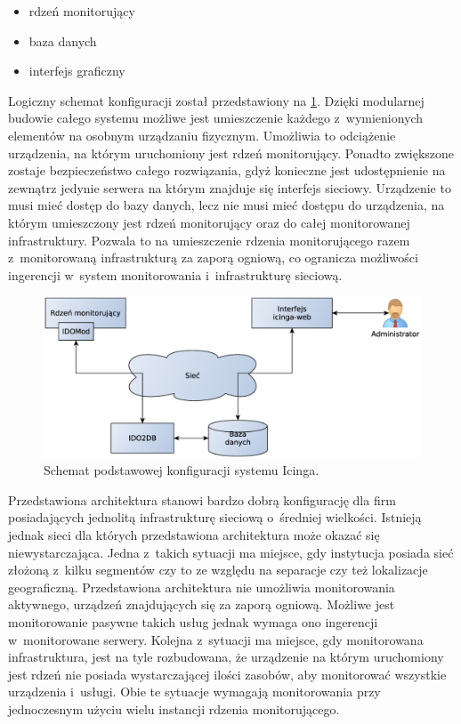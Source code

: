\begin{itemize}
\item rdzeń monitorujący
\item baza danych
\item interfejs graficzny
\end{itemize}

Logiczny schemat konfiguracji został przedstawiony na
\ref{fig:icingaBase}. Dzięki modularnej budowie całego systemu możliwe
jest umieszczenie każdego z~wymienionych elementów na osobnym
urządzaniu fizycznym.  Umożliwia to odciążenie urządzenia, na którym
uruchomiony jest rdzeń monitorujący. Ponadto zwiększone zostaje
bezpieczeństwo całego rozwiązania, gdyż konieczne jest udostępnienie
na zewnątrz jedynie serwera na którym znajduje się interfejs
sieciowy. Urządzenie to musi mieć dostęp do bazy danych, lecz nie musi
mieć dostępu do urządzenia, na którym umieszczony jest rdzeń
monitorujący oraz do całej monitorowanej infrastruktury. Pozwala to na
umieszczenie rdzenia monitorującego razem z~monitorowaną
infrastrukturą za zaporą ogniową, co ogranicza możliwości ingerencji
w~system monitorowania i~infrastrukturę sieciową.

\begin{figure}[h]
  \caption{Schemat podstawowej konfiguracji systemu Icinga.}
  \label{fig:icingaBase}
\includegraphics[width=1\textwidth]{img/icingaBase}
\end{figure}

Przedstawiona architektura stanowi bardzo dobrą konfigurację dla firm
posiadających jednolitą infrastrukturę sieciową o~średniej
wielkości. Istnieją jednak sieci dla których przedstawiona
architektura może okazać się niewystarczająca. Jedna z~takich sytuacji
ma miejsce, gdy instytucja posiada sieć złożoną z~kilku segmentów czy
to ze względu na separacje czy też lokalizacje
geograficzną. Przedstawiona architektura nie umożliwia monitorowania
aktywnego, urządzeń znajdujących się za zaporą ogniową. Możliwe jest
monitorowanie pasywne takich usług jednak wymaga ono ingerencji
w~monitorowane serwery. Kolejna z~sytuacji ma miejsce, gdy
monitorowana infrastruktura, jest na tyle rozbudowana, że urządzenie
na którym uruchomiony jest rdzeń nie posiada wystarczającej ilości
zasobów, aby monitorować wszystkie urządzenia i~usługi. Obie te
sytuacje wymagają monitorowania przy jednoczesnym użyciu wielu
instancji rdzenia monitorującego.


